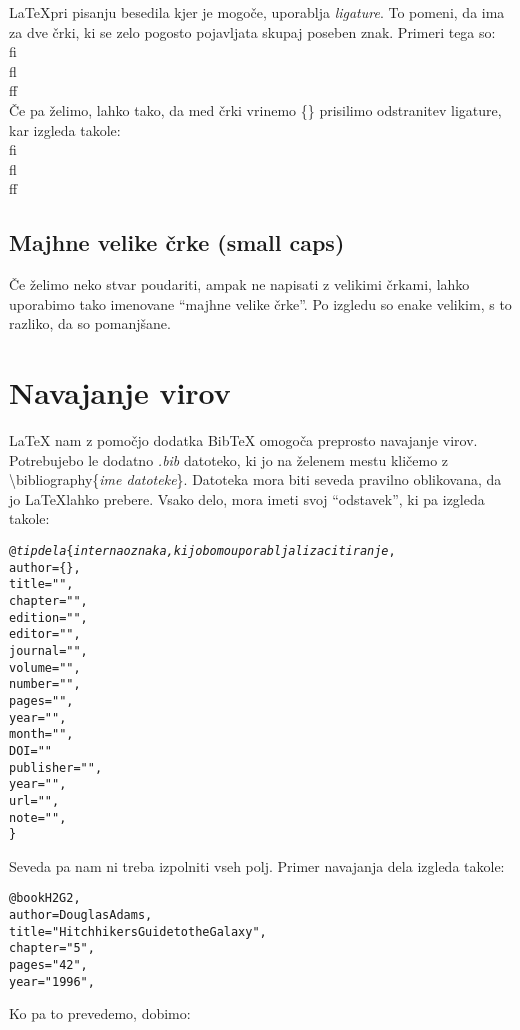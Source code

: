 \documentclass[a4paper]{book}
\newcommand\tbs{\textbackslash{}}
\begin{document}
\LaTeX pri pisanju besedila kjer je mogoče, uporablja \textit{ligature}. To pomeni, da ima za dve črki, ki se zelo pogosto pojavljata skupaj poseben znak. Primeri tega so:\\[15pt]
{\Huge fi}\\[15pt]
{\Huge fl}\\[15pt]
{\Huge ff}\\[15pt]
Če pa želimo, lahko tako, da med črki vrinemo \{\} prisilimo odstranitev ligature, kar izgleda takole:\\[15pt]
{\Huge f{}i}\\[15pt]
{\Huge f{}l}\\[15pt]
{\Huge f{}f}\\[15pt]

\subsection{Majhne velike črke (small caps)}

Če želimo neko stvar poudariti, ampak ne napisati z velikimi črkami, lahko uporabimo tako imenovane ``majhne velike črke''. Po izgledu so enake velikim, s to razliko, da so pomanjšane. 


\section{Navajanje virov}

\LaTeX{} nam z pomočjo dodatka Bib\TeX{} omogoča preprosto navajanje virov. Potrebujebo le dodatno \textit{.bib} datoteko, ki jo na želenem mestu kličemo z \tbs{}bibliography\{\textit{ime datoteke}\}. Datoteka mora biti seveda pravilno oblikovana, da jo \LaTeX lahko prebere.
Vsako delo, mora imeti svoj ``odstavek'', ki pa izgleda takole:

\begin{alltt}

@\textit{tip dela}\{\textit{interna oznaka, ki jo bomo uporabljali za citiranje},
  author = \{\},
  title = "",
  chapter = "",
  edition = "",
  editor = "",
  journal = "",
  volume = "",
  number = "",
  pages = "",
  year = "",
  month = "",
  DOI = ""
  publisher = "",
  year = "",
  url = "",
  note = "",
\}

\end{alltt}

Seveda pa nam ni treba izpolniti vseh polj. Primer navajanja dela izgleda takole:

\begin{alltt}

@book {H2G2,
  author = {Douglas Adams},
  title = "Hitchhikers Guide to the Galaxy",
  chapter = "5",
  pages = "42",
  year = "1996",
}

\end{alltt}

Ko pa to prevedemo, dobimo:

%
%


\end{document}
